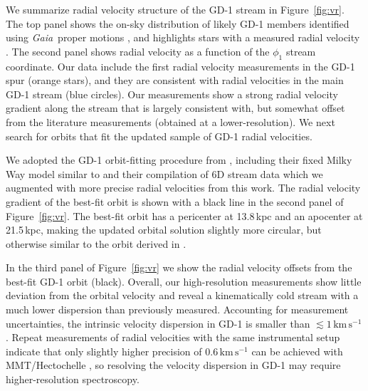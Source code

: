 \documentclass[twocolumn]{aastex63}
\newcommand{\gaia}{\textsl{Gaia}}
\newcommand{\kms}{\ensuremath{\textrm{km}\,\textrm{s}^{-1}}}
\begin{document}
We summarize radial velocity structure of the GD-1 stream in Figure~\ref{fig:vr}.
The top panel shows the on-sky distribution of likely GD-1 members identified using \gaia\ proper motions \citep[small points,][]{pwb}, and highlights stars with a measured radial velocity \citep[blue / orange for this work, gray for literature data from][]{koposov2010}.
The second panel shows radial velocity as a function of the $\phi_1$ stream coordinate.
Our data include the first radial velocity measurements in the GD-1 spur (orange stars), and they are consistent with radial velocities in the main GD-1 stream (blue circles).
Our measurements show a strong radial velocity gradient along the stream that is largely consistent with, but somewhat offset from the literature measurements (obtained at a lower-resolution).
We next search for orbits that fit the updated sample of GD-1 radial velocities.

We adopted the GD-1 orbit-fitting procedure from \citet{pwb}, including their fixed Milky Way model similar to \citet{bovy2015} and their compilation of 6D stream data which we augmented with more precise radial velocities from this work.
The radial velocity gradient of the best-fit orbit is shown with a black line in the second panel of Figure~\ref{fig:vr}.
The best-fit orbit has a pericenter at 13.8\,kpc and an apocenter at 21.5\,kpc, making the updated orbital solution slightly more circular, but otherwise similar to the orbit derived in \citet{pwb}.

In the third panel of Figure~\ref{fig:vr} we show the radial velocity offsets from the best-fit GD-1 orbit (black).
Overall, our high-resolution measurements show little deviation from the orbital velocity and reveal a kinematically cold stream with a much lower dispersion than previously measured.
Accounting for measurement uncertainties, the intrinsic velocity dispersion in GD-1 is smaller than $\lesssim1\,\kms$.
Repeat measurements of radial velocities with the same instrumental setup indicate that only slightly higher precision of $0.6\,\kms$ can be achieved with MMT/Hectochelle \citep{cargile2019}, so resolving the velocity dispersion in GD-1 may require higher-resolution spectroscopy.

\end{document}
